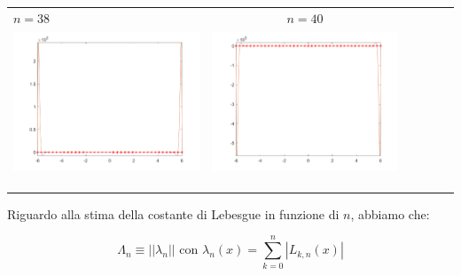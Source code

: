 \begin{tabular}{l*{5}{c}}
\hspace{3.5cm}\(n=38\) &  \(n=40\) \\
\includegraphics[scale=0.5]{cap4/4_9/38.png} &  \includegraphics[scale=0.5]{cap4/4_9/40.png} \\
& \\
& \\
& \\
\end{tabular}

\noindent Riguardo alla stima della costante di Lebesgue in funzione di \(n\), abbiamo che:

\[
\Lambda_n \equiv ||\lambda_n|| \text{ con } \lambda_n(x) = \sum^n_{k=0}|L_{k,n}(x)|
\]

